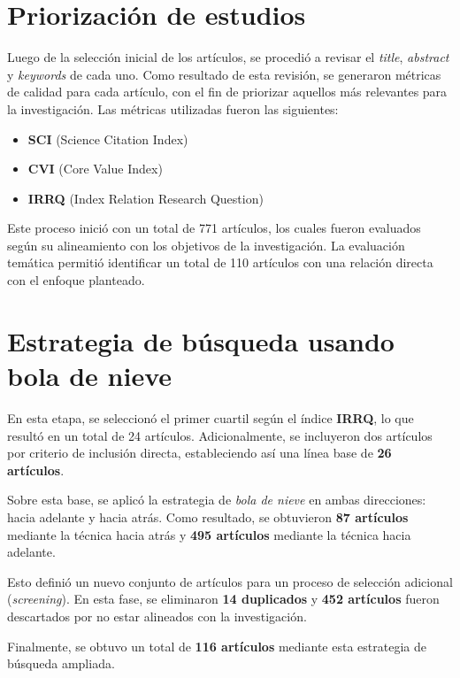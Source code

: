 \section{Priorización de estudios}\label{sec:priorizacionEstudios}

Luego de la selección inicial de los artículos, se procedió a revisar el \textit{title}, \textit{abstract} y \textit{keywords} de cada uno. Como resultado de esta revisión, se generaron métricas de calidad para cada artículo, con el fin de priorizar aquellos más relevantes para la investigación. Las métricas utilizadas fueron las siguientes:

\begin{itemize}
    \item \textbf{SCI} (Science Citation Index)
    \item \textbf{CVI} (Core Value Index)
    \item \textbf{IRRQ} (Index Relation Research Question)
\end{itemize}

Este proceso inició con un total de 771 artículos, los cuales fueron evaluados según su alineamiento con los objetivos de la investigación. La evaluación temática permitió identificar un total de 110 artículos con una relación directa con el enfoque planteado.

\section{Estrategia de búsqueda usando bola de nieve}\label{sec:bolaDeNieve}

En esta etapa, se seleccionó el primer cuartil según el índice \textbf{IRRQ}, lo que resultó en un total de 24 artículos. Adicionalmente, se incluyeron dos artículos por criterio de inclusión directa, estableciendo así una línea base de \textbf{26 artículos}. 

Sobre esta base, se aplicó la estrategia de \textit{bola de nieve} en ambas direcciones: hacia adelante y hacia atrás. Como resultado, se obtuvieron \textbf{87 artículos} mediante la técnica hacia atrás y \textbf{495 artículos} mediante la técnica hacia adelante. 

Esto definió un nuevo conjunto de artículos para un proceso de selección adicional (\textit{screening}). En esta fase, se eliminaron \textbf{14 duplicados} y \textbf{452 artículos} fueron descartados por no estar alineados con la investigación. 

Finalmente, se obtuvo un total de \textbf{116 artículos} mediante esta estrategia de búsqueda ampliada.

